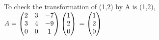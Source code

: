 \documentclass[11pt, oneside]{article}   	%
\begin{document}
To check the transformation of (1,2) by A is (1,2),\\
$A=
\begin{pmatrix}
 2 & 3 & -7\\
 3 & 4 & -9\\
 0 & 0 &1
\end{pmatrix}
\begin{pmatrix}
 1\\
 2\\
 0
\end{pmatrix}\\
 =\begin{pmatrix}
 1\\
 2\\
 0
\end{pmatrix}$





\end{document}
